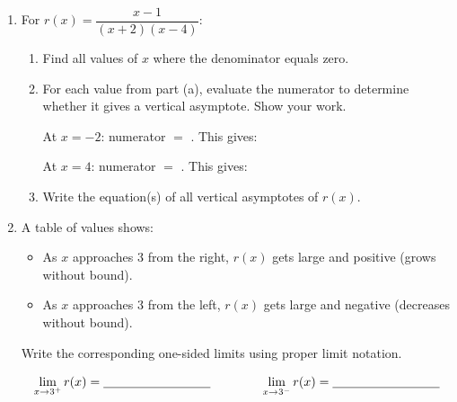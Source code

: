 \documentclass[10pt]{article}
\begin{document}
\namedateperiod

\vspace{0.14in}

\begin{enumerate}[itemsep=16pt]

\item For $r(x) = \dfrac{x - 1}{(x + 2)(x - 4)}$:

\begin{enumerate}[label=(\alph*), itemsep=8pt]
  \item Find all values of $x$ where the denominator equals zero.

        \blank{7cm}

  \item For each value from part (a), evaluate the numerator to determine whether it
        gives a vertical asymptote. Show your work.

        \vspace{0.1in}
        At $x = -2$: numerator $=$ \blank{2.5cm}. \quad This gives: \blank{4cm}

        At $x = 4$: numerator $=$ \blank{2.5cm}. \quad This gives: \blank{4cm}

  \item Write the equation(s) of all vertical asymptotes of $r(x)$.

        \blank{6cm}
\end{enumerate}

\item A table of values shows:
\begin{itemize}[itemsep=3pt]
  \item As $x$ approaches 3 from the right, $r(x)$ gets large and positive (grows without bound).
  \item As $x$ approaches 3 from the left, $r(x)$ gets large and negative (decreases without bound).
\end{itemize}

Write the corresponding one-sided limits using proper limit notation.

\[
  \lim_{x \to 3^+} r(x) = \blank{3cm}
  \qquad\qquad
  \lim_{x \to 3^-} r(x) = \blank{3cm}
\]

\end{enumerate}
\end{document}
